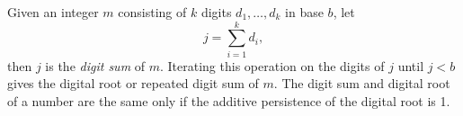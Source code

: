 \documentclass[12pt]{article}
\begin{document}
Given an integer $m$ consisting of $k$ digits $d_1, \dots, d_k$ in base $b$, let $$j = \sum_{i = 1}^{k} d_i,$$ then $j$ is the \emph{digit sum} of $m$. Iterating this operation on the digits of $j$ until $j < b$ gives the digital root or repeated digit sum of $m$. The digit sum and digital root of a number are the same only if the additive persistence of the digital root is 1.
\end{document}
